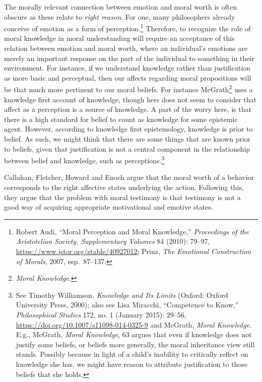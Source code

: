 \documentclass[phdthesis,12pt,final,a4paper]{wuthesis}
\theoremstyle{definition}
\theoremstyle{definition}
\theoremstyle{definition}
\theoremstyle{definition}
\theoremstyle{remark}
\begin{document}
The morally relevant connection between emotion and moral worth is often obscure as these relate to \emph{right reason}. For one, many philosophers already conceive of emotion as a form of perception.\footnote{Robert Audi, {``Moral {Perception} and {Moral Knowledge},''} \emph{Proceedings of the Aristotelian Society, Supplementary Volumes} 84 (2010): 79--97, \url{https://www.jstor.org/stable/40927012}; Prinz, \emph{The {Emotional Construction} of {Morals}}, 2007, esp.~87--137.} Therefore, to recognize the role of moral knowledge in moral understanding will require an acceptance of this relation between emotion and moral worth, where an individual's emotions are merely an important response on the part of the individual to something in their environment. For instance, if we understand knowledge rather than justification as more basic and perceptual, then our affects regarding moral propositions will be that much more pertinent to our moral beliefs. For instance McGrath\footnote{\emph{Moral {Knowledge}}.} uses a knowledge first account of knowledge, though hers does not seem to consider that affect as a perception is a source of knowledge. A part of the worry here, is that there is a high standard for belief to count as knowledge for some epistemic agent. However, according to knowledge first epistemology, knowledge is prior to belief. As such, we might think that there are some things that are known prior to beliefs, given that justification is not a central component in the relationship between belief and knowledge, such as perceptions.\footnote{See Timothy Williamson, \emph{Knowledge and {Its Limits}} (Oxford: Oxford University Press, 2000); also see Lisa Miracchi, {``Competence to Know,''} \emph{Philosophical Studies} 172, no. 1 (January 2015): 29--56, \url{https://doi.org/10.1007/s11098-014-0325-9} and McGrath, \emph{Moral {Knowledge}}. E.g., McGrath, \emph{Moral {Knowledge}}, 63 argues that even if knowledge does not justify some beliefs, or beliefs more generally, the moral inheritance view still stands. Possibly because in light of a child's inability to critically reflect on knowledge she has, we might have reason to attribute justification to those beliefs that she holds.}

Callahan, Fletcher, Howard and Enoch argue that the moral worth of a behavior corresponds to the right affective states underlying the action. Following this, they argue that the problem with moral testimony is that testimony is not a good way of acquiring appropriate motivational and emotive states.
\end{document}
